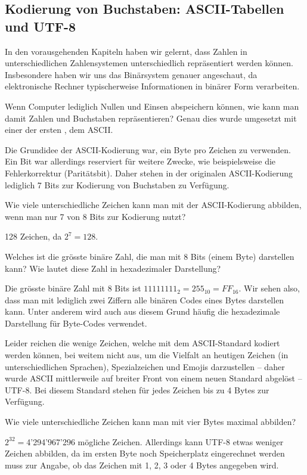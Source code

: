 \subsection{Kodierung von Buchstaben: ASCII-Tabellen und UTF-8}
In den vorausgehenden Kapiteln haben wir gelernt, dass Zahlen in unterschiedlichen Zahlensystemen unterschiedlich repräsentiert werden können. Insbesondere haben wir uns das Binärsystem genauer angeschaut, da elektronische Rechner typischerweise Informationen in binärer Form verarbeiten.

Wenn Computer lediglich Nullen und Einsen abspeichern können, wie kann man damit Zahlen und Buchstaben repräsentieren? Genau dies wurde umgesetzt mit einer der ersten , dem \gls{ASCII}.

Die Grundidee der \gls{ASCII}-Kodierung war, ein Byte pro Zeichen zu verwenden. Ein Bit war allerdings reserviert für weitere Zwecke, wie beispielsweise die Fehlerkorrektur (Paritätsbit). Daher stehen in der originalen ASCII-Kodierung lediglich 7 Bits zur Kodierung von Buchstaben zu Verfügung.

\begin{myexercise}
	Wie viele unterschiedliche Zeichen kann man mit der ASCII-Kodierung abbilden, wenn man nur 7 von 8 Bits zur Kodierung nutzt?
	\begin{myanswer}
		128 Zeichen, da $2^7=128$.
	\end{myanswer}
\end{myexercise}
\begin{myexercise}
	Welches ist die grösste binäre Zahl, die man mit 8 Bits (einem Byte) darstellen kann? Wie lautet diese Zahl in hexadezimaler Darstellung?
	\begin{myanswer}
		Die grösste binäre Zahl mit 8 Bits ist $11111111_2 = 255_{10} = FF_{16}$. Wir sehen also, dass man mit lediglich zwei Ziffern alle binären Codes eines Bytes darstellen kann. Unter anderem wird auch aus diesem Grund häufig die hexadezimale Darstellung für Byte-Codes verwendet.
	\end{myanswer}
\end{myexercise}

Leider reichen die wenige Zeichen, welche mit dem \gls{ASCII}-Standard kodiert werden können, bei weitem nicht aus, um die Vielfalt an heutigen Zeichen (in unterschiedlichen Sprachen), Spezialzeichen und Emojis darzustellen -- daher wurde \gls{ASCII} mittlerweile auf breiter Front von einem neuen Standard abgelöst -- \gls{UTF-8}. Bei diesem Standard stehen für jedes Zeichen bis zu 4 Bytes zur Verfügung.
\begin{myexercise}
	Wie viele unterschiedliche Zeichen kann man mit vier Bytes maximal abbilden?
	\begin{myanswer}
		$2^{32}=$4’294’967’296 mögliche Zeichen. Allerdings kann UTF-8 etwas weniger Zeichen abbilden, da im ersten Byte noch Speicherplatz eingerechnet werden muss zur Angabe, ob das Zeichen mit 1, 2, 3 oder 4 Bytes angegeben wird.
	\end{myanswer}
\end{myexercise}


